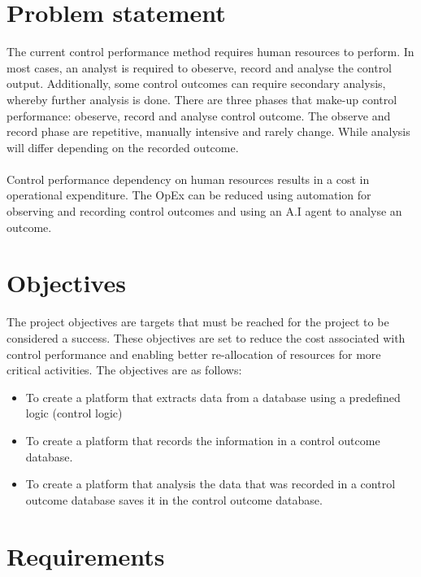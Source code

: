 \documentclass{article}
\begin{document}
\section{Problem statement}
The current control performance method requires human resources to perform. In most cases, an analyst is required to obeserve, record and analyse the control output. Additionally, some control outcomes can require secondary analysis, whereby further analysis is done. There are three phases that make-up control performance: obeserve, record and analyse control outcome. The observe and record phase are repetitive, manually intensive and rarely change. While analysis will differ depending on the recorded outcome.\\
\\
Control performance dependency on human resources results in a cost in operational expenditure. The OpEx can be reduced using automation for observing and recording control outcomes and using an A.I agent to analyse an outcome.

\section{Objectives}
The project objectives are targets that must be reached for the project to be considered a success. These objectives are set to reduce the cost associated with control performance and enabling better re-allocation of resources for more critical activities. The objectives are as follows:
\begin{itemize}
    \item To create a platform that extracts data from a database using a predefined logic (control logic)
    \item To create a platform that records the information in a control outcome database.
    \item To create a platform that analysis the data that was recorded in a control outcome database saves it in the control outcome database.
\end{itemize}
\section{Requirements}
\end{document}
